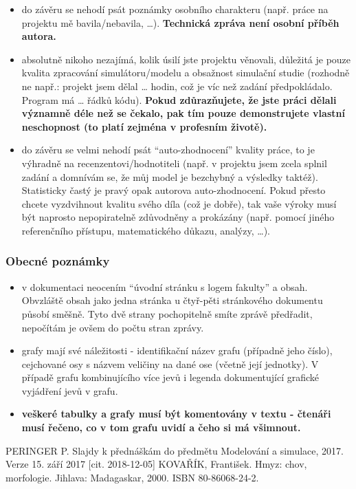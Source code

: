 \documentclass{article}
\begin{document}
\begin{itemize}
\tightlist
\item
  do závěru se nehodí psát poznámky osobního charakteru (např. práce na
  projektu mě bavila/nebavila, \ldots{}). \textbf{Technická zpráva není
  osobní příběh autora.}
\item
  absolutně nikoho nezajímá, kolik úsilí jste projektu věnovali,
  důležitá je pouze kvalita zpracování simulátoru/modelu a obsažnost
  simulační studie (rozhodně ne např.: projekt jsem dělal \ldots{}
  hodin, což je víc než zadání předpokládalo. Program má \ldots{} řádků
  kódu). \textbf{Pokud zdůrazňujete, že jste práci dělali významně déle
  než se čekalo, pak tím pouze demonstrujete vlastní neschopnost (to
  platí zejména v profesním životě).}
\item
  do závěru se velmi nehodí psát ``auto-zhodnocení'' kvality práce, to
  je výhradně na recenzentovi/hodnotiteli (např. v projektu jsem zcela
  splnil zadání a domnívám se, že můj model je bezchybný a výsledky
  taktéž). Statisticky častý je pravý opak autorova auto-zhodnocení.
  Pokud přesto chcete vyzdvihnout kvalitu svého díla (což je dobře), tak
  vaše výroky musí být naprosto nepopiratelně zdůvodněny a prokázány
  (např. pomocí jiného referenčního přístupu, matematického důkazu,
  analýzy, \ldots{}).
\end{itemize}

\subsubsection{Obecné poznámky}\label{obecnuxe9-poznuxe1mky}

\begin{itemize}
\tightlist
\item
  v dokumentaci neocením ``úvodní stránku s logem fakulty'' a obsah.
  Obvzláště obsah jako jedna stránka u čtyř-pěti stránkového dokumentu
  působí směšně. Tyto dvě strany pochopitelně smíte zprávě předřadit,
  nepočítám je ovšem do počtu stran zprávy.
\item
  grafy mají své náležitosti - identifikační název grafu (případně jeho
  číslo), cejchované osy s názvem veličiny na dané ose (včetně její
  jednotky). V případě grafu kombinujícího více jevů i legenda
  dokumentující grafické vyjádření jevů v grafu.
\item
  \textbf{veškeré tabulky a grafy musí být komentovány v textu - čtenáři
  musí řečeno, co v tom grafu uvidí a čeho si má všimnout.}
\end{itemize}






    \begin{thebibliography}{zdroje}
         \label{ims} PERINGER P. Slajdy k přednáškám do předmětu Modelování a simulace, 2017. Verze 15. září 2017 [cit. 2018-12-05]
         \label{kniha} KOVAŘÍK, František. Hmyz: chov, morfologie. Jihlava: Madagaskar, 2000. ISBN 80-86068-24-2.
    \end{thebibliography}
\end{document}
